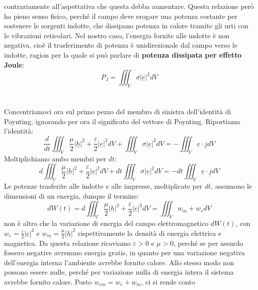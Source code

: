 \documentclass{book}
\begin{document}
        contrariamente all'aspettativa che questa debba aumentare. Questa relazione però ha pieno senso fisico, perché il campo deve erogare una potenza costante per sostenere
        le sorgenti indotte, che dissipano potenza in calore tramite gli urti con le vibrazioni reticolari. Nel nostro caso, l'energia fornite alle indotte è non negativa, cioè il 
        trasferimento di potenza è unidirezionale dal campo verso le indotte, ragion per la quale si può parlare di \textbf{potenza dissipata per effetto Joule}:
        \begin{equation}
            P_{J} = \iiint_{V} \sigma |\underline{e}|^{2}dV
        \end{equation}
        \\ \\
        Concentriamoci ora sul primo pezzo del membro di sinistra dell'identità di Poynting, ignorando per ora il significato del vettore di Poynting. Riportiamo l'identità:
        \begin{equation}
            \frac{d}{dt} \iiint_{V} \frac{\mu}{2}|\underline{h}|^{2}+\frac{\varepsilon}{2}|\underline{e}|^{2}dV+ \iiint_{V} \sigma |\underline{e}|^{2}dV = - \iiint_{V}\underline{e}\cdot \underline{j}dV
        \end{equation}
        Moltiplichiamo ambo membri per $dt$:
        \begin{equation}
            d \iiint_{V} \frac{\mu}{2}|\underline{h}|^{2}+\frac{\varepsilon}{2}|\underline{e}|^{2}dV+ dt\iiint_{V} \sigma |\underline{e}|^{2}dV = -dt \iiint_{V}\underline{e}\cdot \underline{j}dV
        \end{equation}
        Le potenze trasferite alle indotte e alle impresse, moltiplicate per $dt$, assumono le dimensioni di un energia, dunque il termine:
        \begin{equation}
            dW(t) = d \iiint_{V} \frac{\mu}{2}|\underline{h}|^{2}+\frac{\varepsilon}{2}|\underline{e}|^{2}dV = \iiint_{V} w_{m}+w_{e} dV
        \end{equation}
        non è altro che la variazione di energia del campo elettromagnetico $dW(t)$, con $w_{e} = \frac{\varepsilon}{2}|\underline{e}|^{2}$ 
        e $w_{m}=\frac{\mu}{2}|\underline{h}|^{2}$ rispettivamente la densità di energia elettrica e magnetica. Da questa relazione ricaviamo $\varepsilon>0$ e 
        $\mu >0$, perché se per assurdo fossero negative avremmo energia gratis, in quanto per una variazione negativa dell'energia interna l'ambiente avrebbe fornito calore. Allo stesso modo
        non possono essere nulle, perché per variazione nulla di energia intera il sistema avrebbe fornito calore. Posto $w_{em}= w_{e}+w_{m}$, ci si rende conto 
\end{document}
